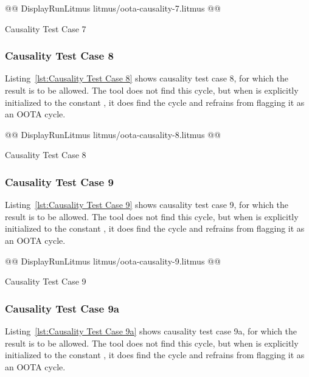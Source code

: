 \documentclass[10]{article}
\begin{document}
\begin{listing}[tbp]
@@ DisplayRunLitmus litmus/oota-causality-7.litmus @@
\caption{Causality Test Case 7}
\label{lst:Causality Test Case 7}
\end{listing}

\subsubsection{Causality Test Case 8}
\label{app:Causality Test Case 8}

Listing~\ref{lst:Causality Test Case 8}
shows causality test case 8, for which the 
result is to be allowed.
The  tool does not find this cycle, but when  is explicitly
initialized to the constant , it does find the cycle and refrains
from flagging it as an OOTA cycle.

\begin{listing}[tbp]
@@ DisplayRunLitmus litmus/oota-causality-8.litmus @@
\caption{Causality Test Case 8}
\label{lst:Causality Test Case 8}
\end{listing}

\subsubsection{Causality Test Case 9}
\label{app:Causality Test Case 9}

Listing~\ref{lst:Causality Test Case 9}
shows causality test case 9, for which the 
result is to be allowed.
The  tool does not find this cycle, but when  is explicitly
initialized to the constant , it does find the cycle and refrains
from flagging it as an OOTA cycle.

\begin{listing}[tbp]
@@ DisplayRunLitmus litmus/oota-causality-9.litmus @@
\caption{Causality Test Case 9}
\label{lst:Causality Test Case 9}
\end{listing}

\subsubsection{Causality Test Case 9a}
\label{app:Causality Test Case 9a}

Listing~\ref{lst:Causality Test Case 9a}
shows causality test case 9a, for which the 
result is to be allowed.
The  tool does not find this cycle, but when  is explicitly
initialized to the constant , it does find the cycle and refrains
from flagging it as an OOTA cycle.
\end{document}
